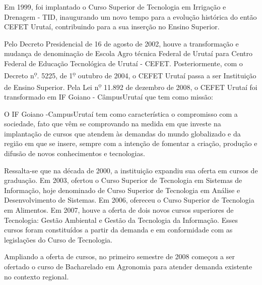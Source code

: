 Em 1999, foi implantado o Curso Superior de Tecnologia em Irrigação e
Drenagem - TID, inaugurando um novo tempo para a evolução histórica do
então CEFET Urutaí, contribuindo para a sua inserção no Ensino
Superior.

Pelo Decreto Presidencial de 16 de agosto de 2002, houve a
transformação e mudança de denominação de Escola Agro técnica Federal
de Urutaí para Centro Federal de Educação Tecnológica de Urutaí -
CEFET.  Posteriormente, com o Decreto n\textsuperscript{\d o}.  5225,
de 1\textsuperscript{\d o} outubro de 2004, o CEFET Urutaí passa a ser
Instituição de Ensino Superior.  Pela Lei n\textsuperscript{\d o}
11.892 de dezembro de 2008, o CEFET Urutaí foi transformado em IF
Goiano - CâmpusUrutaí que tem como missão: \\
\vspace{1cm}\hfill {}

O IF Goiano -CampusUrutaí tem como característica o compromisso com a
sociedade, fato que vêm se comprovando na medida em que investe na
implantação de cursos que atendem às demandas do mundo globalizado e
da região em que se insere, sempre com a intenção de fomentar a
criação, produção e difusão de novos conhecimentos e tecnologias.

Ressalta-se que na década de 2000, a instituição expandiu sua oferta
em cursos de graduação.  Em 2003, ofertou o Curso Superior de
Tecnologia em Sistemas de Informação, hoje denominado de Curso
Superior de Tecnologia em Análise e Desenvolvimento de Sistemas. Em
2006, ofereceu o Curso Superior de Tecnologia em Alimentos. Em 2007,
houve a oferta de dois novos cursos superiores de Tecnologia: Gestão
Ambiental e Gestão da Tecnologia da Informação.  Esses cursos foram
constituídos a partir da demanda e em conformidade com as legislações
do Curso de Tecnologia.

Ampliando a oferta de cursos, no primeiro semestre de 2008 começou a
ser ofertado o curso de Bacharelado em Agronomia para atender demanda
existente no contexto regional.

